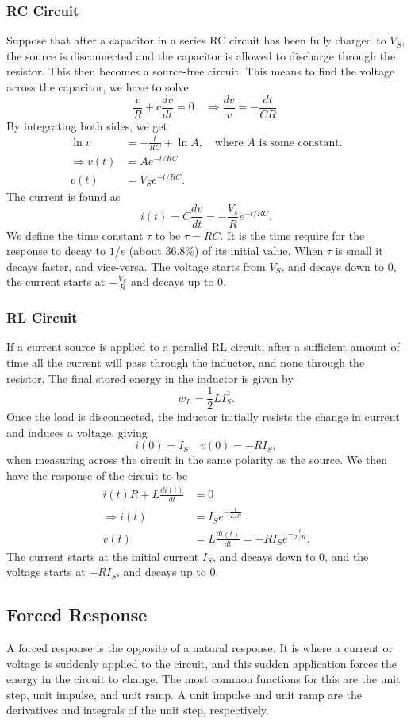 \documentclass{article}
\begin{document}
\subsubsection{RC Circuit}
Suppose that after a capacitor in a series RC circuit has been fully charged to $V_S$, the source is disconnected and the capacitor is allowed to discharge through the resistor. This then becomes a source-free circuit. This means to find the voltage across the capacitor, we have to solve 
\[
    \frac{v}{R}+c \frac{d v}{d t}=0\quad\Rightarrow \frac{dv}{v}=-\frac{dt}{CR}.
\]
By integrating both sides, we get
\begin{align*}
    \ln v &= -\frac{t}{RC}+\ln A,\quad \text{where }A \text{ is some constant}.\\
    \Rightarrow v(t)&=Ae^{-t/RC}\\
    v(t)&= V_S e^{-t/RC}.
\end{align*}
The current is found as 
\[
    i(t)=C \frac{d v}{d t}=-\frac{V_s}{R}e^{-t/RC}.
\]
We define the time constant $\tau$ to be $\tau =RC$. It is the time require for the response to decay to $1/e$ (about $36.8\%$) of its initial value. When $\tau $ is small it decays faster, and vice-versa. The voltage starts from $V_S$, and decays down to $0$, the current starts at $-\frac{V_S}{R}$ and decays up to $0$.

\subsubsection{RL Circuit}
If a current source is applied to a parallel RL circuit, after a sufficient amount of time all the current will pass through the inductor, and none through the resistor. The final stored energy in the inductor is given by 
\[
    w_L=\frac{1}{2}LI_S^2.
\]
Once the load is disconnected, the inductor initially resists the change in current and induces a voltage, giving 
\[
    i(0)=I_S\quad v(0)=-RI_S,
\]
when measuring across the circuit in the same polarity as the source. We then have the response of the circuit to be
\begin{align*}
    i(t)R +L \frac{d i(t)}{d t}&= 0\\
    \Rightarrow i(t)&= I_Se^{-\frac{t}{L/R}}\\
    v(t)&= L \frac{d i(t)}{d t}=-RI_Se^{-\frac{t}{L/R}}.
\end{align*}
The current starts at the initial current $I_S$, and decays down to $0$, and the voltage starts at $-RI_S$, and decays up to $0$.

\subsection{Forced Response}
A forced response is the opposite of a natural response. It is where a current or voltage is suddenly applied to the circuit, and this sudden application forces the energy in the circuit to change. The most common functions for this are the unit step, unit impulse, and unit ramp. A unit impulse and unit ramp are the derivatives and integrals of the unit step, respectively.
\end{document}
